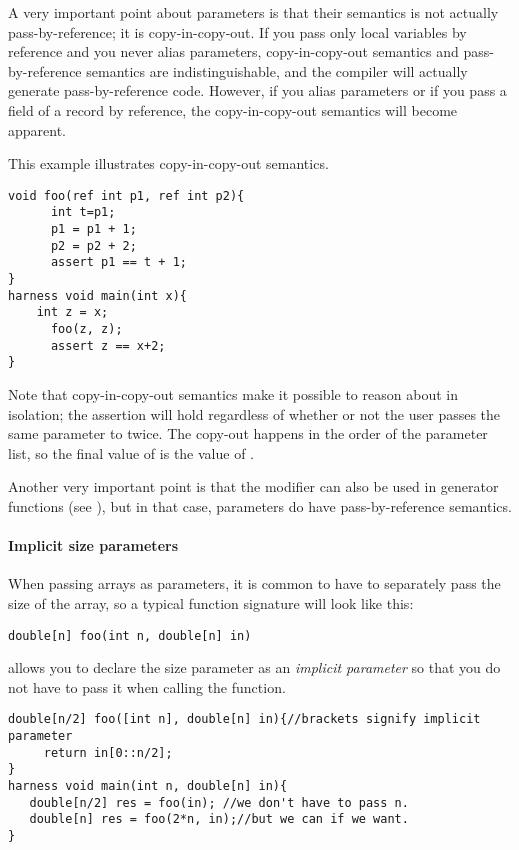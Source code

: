 A very important point about  parameters is that their semantics is not actually pass-by-reference; it is copy-in-copy-out. If you pass only local variables by reference and you never alias  parameters, copy-in-copy-out semantics and pass-by-reference semantics are indistinguishable, and the compiler will actually generate pass-by-reference code. However, if you alias parameters or if you pass a field of a record by reference, the copy-in-copy-out semantics will become apparent.

\begin{Example}
This example illustrates copy-in-copy-out semantics.
\begin{lstlisting}
void foo(ref int p1, ref int p2){
      int t=p1;
      p1 = p1 + 1;
      p2 = p2 + 2;
      assert p1 == t + 1;
}
harness void main(int x){
	int z = x;
      foo(z, z);
      assert z == x+2;
}
\end{lstlisting}
Note that copy-in-copy-out semantics make it possible to reason about  in isolation; the assertion will hold regardless of whether or not the user passes the same parameter to  twice. The copy-out happens in the order of the parameter list, so the final value of  is the value of .
\end{Example}

Another very important point is that the  modifier can also be used in generator functions (see ), but in that case,  parameters do have pass-by-reference semantics.


\paragraph{Implicit size parameters}

When passing arrays as parameters, it is common to have to separately pass the size of the array, so a typical function signature will look like this:
\begin{lstlisting}
double[n] foo(int n, double[n] in)
\end{lstlisting}

\Sk{} allows you to declare the size parameter  as an \emph{implicit parameter} so that you do not have to pass it when calling the function.

\begin{lstlisting}
double[n/2] foo([int n], double[n] in){//brackets signify implicit parameter
     return in[0::n/2];
}
harness void main(int n, double[n] in){
   double[n/2] res = foo(in); //we don't have to pass n.
   double[n] res = foo(2*n, in);//but we can if we want.
}
\end{lstlisting}

